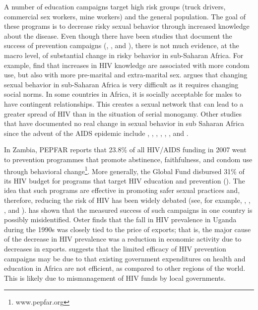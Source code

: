 \documentclass[12pt]{article}
\newcommand{\citee}[1]{\citet*{#1}}
\begin{document}
A number of education campaigns target high risk groups (truck drivers, commercial sex workers, mine workers) and the general population.  The goal of these programs is to decrease risky sexual behavior through increased knowledge about the disease.  Even though there have been studies that document the success of prevention campaigns (\citee{NM1999}, \citee{EG2006}, and \citee{PD2009}), there is not much evidence, at the macro level, of substantial change in risky behavior in sub-Saharan Africa. For example, \citee{AAP2010} find that increases in HIV knowledge are associated with more condom use, but also with more pre-marital and extra-marital sex.  \citee{HE2007} argues that changing sexual behavior in sub-Saharan Africa is very difficult as it requires changing social norms.  In some countries in Africa, it is socially acceptable for males to have contingent relationships.  This creates a sexual network that can lead to a greater spread of HIV than in the situation of serial monogamy.  Other studies that have documented no real change in sexual behavior in sub Saharan Africa since the advent of the AIDS epidemic include \citee{Lin1991}, \citee{L1996}, \citee{Ng1996}, \citee{Cald1999}, \citee{Bloom2000}, \citee{Wil2003}, and \citee{Stone2004}.

In Zambia, PEPFAR reports that 23.8\% of all HIV/AIDS funding in 2007 went to prevention programmes that promote abstinence, faithfulness, and condom use through behavioral change\footnote{www.pepfar.org}. More generally, the Global Fund disbursed 31\% of its HIV budget for programs that target HIV education and prevention (\citee{GF2011}). The idea that such programs are effective in promoting safer sexual practices and, therefore, reducing the risk of HIV has been widely debated (see, for example, \citee{VD2000}, \citee{Bloom2000}, \citee{EHAP2006}, and \citee{DW2009}).  \citee{eo2007} has shown that the measured success of such campaigns in one country is possibly misidentified.  Oster finds that the fall in HIV prevalence in Uganda during the 1990s was closely tied to the price of exports; that is, the major cause of the decrease in HIV prevalence was a reduction in economic activity due to decreases in exports.  \citee{GV2001} suggests that the limited efficacy of HIV prevention campaigns may be due to that existing government expenditures on health and education in Africa are not efficient, as compared to other regions of the world.  This is likely due to mismanagement of HIV funds by local governments.
\end{document}
